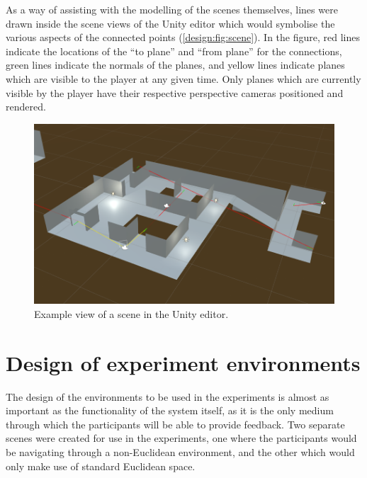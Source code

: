 		As a way of assisting with the modelling of the scenes themselves, lines were drawn inside the scene views of the Unity editor which would symbolise the various aspects of the connected points (\autoref{design:fig:scene}).
		In the figure, red lines indicate the locations of the \enquote{to plane} and \enquote{from plane} for the connections, green lines indicate the normals of the planes, and yellow lines indicate planes which are visible to the player at any given time.
		Only planes which are currently visible by the player have their respective perspective cameras positioned and rendered.

		\begin{figure}[H]
			\includegraphics[width=1\textwidth]{Images/Lines_Everywhere2}
			\centering
			\caption{Example view of a scene in the Unity editor.}
			\label{design:fig:scene}
		\end{figure}

	\section[Environment Design]{Design of experiment environments}
	\label{design:design}

		The design of the environments to be used in the experiments is almost as important as the functionality of the system itself, as it is the only medium through which the participants will be able to provide feedback.
		Two separate scenes were created for use in the experiments, one where the participants would be navigating through a non-Euclidean environment, and the other which would only make use of standard Euclidean space. %

